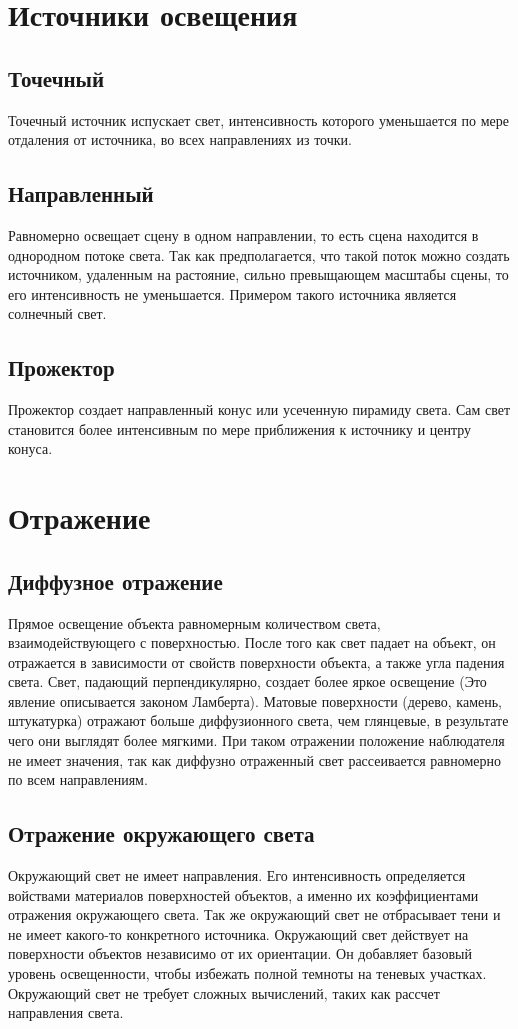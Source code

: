 \section{Источники освещения}
\subsection{Точечный}
Точечный источник испускает свет, интенсивность которого уменьшается по мере отдаления от источника, во всех направлениях из точки.

\subsection{Направленный}
Равномерно освещает сцену в одном направлении, то есть сцена находится в однородном потоке света. Так как предполагается, что такой поток можно создать источником, удаленным на растояние, сильно превыщающем масштабы сцены, то его интенсивность не уменьшается. Примером такого источника является солнечный свет.

\subsection{Прожектор}
Прожектор создает направленный конус или усеченную пирамиду света. Сам свет становится более интенсивным по мере приближения к источнику и центру конуса.


\section{Отражение}
\subsection{Диффузное отражение}
Прямое освещение объекта равномерным количеством света, взаимодействующего с поверхностью. После того как свет падает на объект, он отражается в зависимости от свойств поверхности объекта, а также угла падения света. Свет, падающий перпендикулярно, создает более яркое освещение (Это явление описывается законом Ламберта). Матовые поверхности (дерево, камень, штукатурка) отражают больше диффузионного света, чем глянцевые, в результате чего они выглядят более мягкими.
При таком отражении положение наблюдателя не имеет значения, так как диффузно отраженный свет рассеивается равномерно по всем направлениям.

\subsection{Отражение окружающего света}
Окружающий свет не имеет направления. Его интенсивность определяется войствами материалов поверхностей объектов, а именно их коэффициентами отражения окружающего света.
Так же окружающий свет не отбрасывает тени и не имеет какого-то конкретного источника.
Окружающий свет действует на поверхности объектов независимо от их ориентации. Он добавляет базовый уровень освещенности, чтобы избежать полной темноты на теневых участках. Окружающий свет не требует сложных вычислений, таких как рассчет направления света.
 
